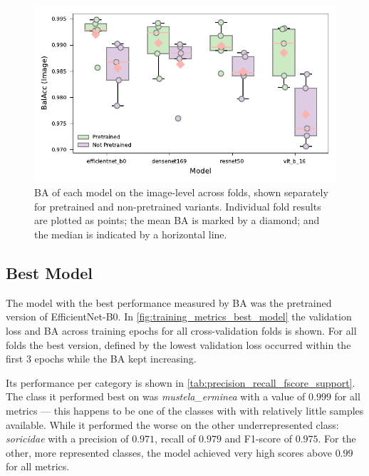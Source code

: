     

    \begin{figure}[ht]
    \centering
    \includegraphics{figures/bal_acc_img.pdf}
    \caption{\acs{BA} of each model on the image-level across folds, shown separately for pretrained and non-pretrained variants. Individual fold results are plotted as points; the mean \acs{BA} is marked by a diamond; and the median is indicated by a horizontal line.}
    \label{fig:bal_acc_img}
    \end{figure}

    \subsection{Best Model}

    The model with the best performance measured by \ac{BA} was the pretrained version of EfficientNet-B0.
    In \autoref{fig:training_metrics_best_model} the validation loss and \ac{BA} across training epochs for all cross-validation folds is shown.
    For all folds the best version, defined by the lowest validation loss occurred within the first 3 epochs while the \ac{BA} kept increasing.

    Its performance per category is shown in \autoref{tab:precision_recall_fscore_support}.
    The class it performed best on was \textit{mustela\_erminea} with a value of \(0.999\) for all metrics --- this happens to be one of the classes with with relatively little samples available.
    While it performed the worse on the other underrepresented class: \textit{soricidae} with a precision of \(0.971\), recall of \(0.979\) and F1-score of \(0.975\).
    For the other, more represented classes, the model achieved very high scores above \(0.99\) for all metrics.

